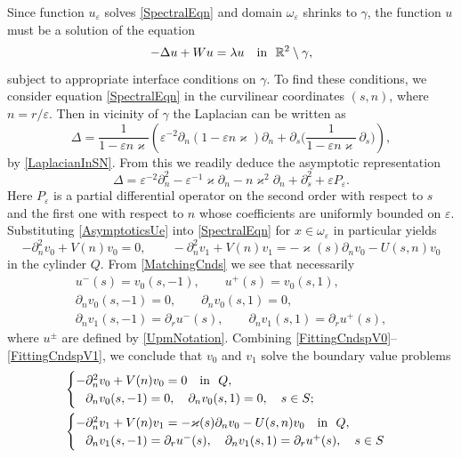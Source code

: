 \documentclass[reqno]{amsart}
\theoremstyle{plain}
\numberwithin{equation}{section}
\renewcommand{\kappa}{\varkappa}
\newcommand{\Real}{\mathbb R}
\newcommand{\eps}{\varepsilon}
\newcommand{\pte}{\partial_n}
\begin{document}
Since function $u_\eps$ solves \eqref{SpectralEqn} and domain $\omega_\eps$ shrinks to $\gamma$, the function $u$ must be a solution of the equation
\begin{equation*}
-\Delta u+Wu= \lambda u \quad \hbox{in \ } \Real^2\setminus \gamma,
\end{equation*}
subject to appropriate interface conditions on $\gamma$.
To find these conditions, we consider equation \eqref{SpectralEqn} in the curvilinear coordinates $(s,n)$, where $n=r/\eps$. Then in vicinity of $\gamma$ the Laplacian can be written as
\begin{equation*}
  \Delta =\frac1{1-\eps n\kappa}\left( \eps^{-2}\partial_n
  (1-\eps n\kappa)\partial_n +\partial_s
  \Big(\frac1{1-\eps n\kappa}\,\partial_s\Big)\right),
\end{equation*}
by \eqref{LaplacianInSN}.
From this we readily deduce the asymptotic representation
\begin{equation}\label{LaplaceExpansion}
\Delta= \eps^{-2}\partial^2_n-\eps^{-1}\kappa\partial_n
-n\kappa^2\partial_n+\partial^2_s+\eps P_\eps.
\end{equation}
Here $P_\eps$ is a partial differential operator on the second order with respect to $s$ and the first one with respect to $n$ whose coefficients  are uniformly bounded on $\eps$.
Substituting \eqref{AsymptoticsUe} into \eqref{SpectralEqn} for $x\in \omega_\eps$ in particular yields
\begin{equation}\label{EqnsV0V1}
-\pte^2 v_0+V(n)v_0=0,
\qquad
-\pte^2 v_1+V(n)v_1=-\kappa(s)\pte v_0-U(s,n)v_0
\end{equation}
in the cylinder $Q$.
From \eqref{MatchingCnds} we see that necessarily
\begin{gather}\label{FittingCndsUV0}
 u^-(s)=v_0(s,-1),\qquad u^+(s)=v_0(s,1),
 \\\label{FittingCndspV0}
 \partial_n v_0(s,- 1)=0, \qquad \partial_n v_0(s, 1)=0, \\\label{FittingCndspV1}
 \partial_n v_1(s, -1)=\partial_r u^-(s), \qquad
 \partial_n v_1(s, 1)=\partial_r u^+(s),
\end{gather}
where $u^\pm$ are defined by \eqref{UpmNotation}.
Combining \eqref{FittingCndspV0}--\eqref{FittingCndspV1}, we conclude that $v_0$ and $v_1$ solve the boundary value problems
\begin{align}\label{problemV0}
&\begin{cases}
  -\pte^2 v_0+V(n)v_0=0 \quad \hbox{in \ } Q, \\
    \phantom{-}\partial_n v_0(s,- 1)=0, \quad \partial_n v_0(s, 1)=0, \quad s\in S;
\end{cases}
\\\label{problemV1}
&\begin{cases}
  -\pte^2 v_1+V(n)v_1=-\kappa(s)\pte v_0-U(s,n)v_0\quad \hbox{in \ } Q, \\
    \phantom{-}\partial_n v_1(s, -1)=\partial_r u^-(s), \quad
\partial_n v_1(s, 1)=\partial_r u^+(s), \quad s\in S
\end{cases}
\end{align}
\end{document}
